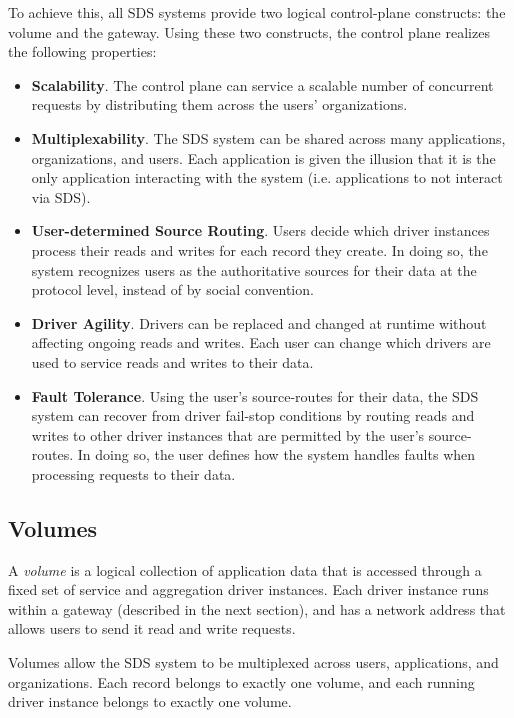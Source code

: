 To achieve this, all SDS systems provide two logical control-plane
constructs: the volume and the gateway.  Using these two constructs, the control
plane realizes the following properties:

\begin{itemize}
    \item \textbf{Scalability}.  The control plane can service a scalable number
       of concurrent requests by distributing them across the users'
       organizations.
    \item \textbf{Multiplexability}.  The SDS system can be shared across many
       applications, organizations, and users.  Each application is given the
       illusion that it is the only application interacting with the system
       (i.e. applications to not interact via SDS).
    \item \textbf{User-determined Source Routing}.  Users decide which driver
       instances process their reads and writes for each record they create.
       In doing so, the system recognizes users as the authoritative sources for
       their data at the protocol level, instead of by social convention.
    \item \textbf{Driver Agility}.  Drivers can be replaced and changed at
       runtime without affecting ongoing reads and writes.  Each user can change
       which drivers are used to service reads and writes to their data.
    \item \textbf{Fault Tolerance}.  Using the user's source-routes for their
       data, the SDS system can recover from driver fail-stop conditions by
       routing reads and writes to other driver instances that are permitted by
       the user's source-routes.  In doing so, the user defines how the system
       handles faults when processing requests to their data.
\end{itemize}

\subsection{Volumes}

A \emph{volume} is a logical collection of
application data that is accessed through a fixed set of service and aggregation
driver instances.  Each driver instance runs within a gateway
(described in the next section), and has a
network address that allows users to send it read and write
requests.  

Volumes allow the SDS system to be multiplexed across users, applications, and
organizations.  Each record belongs to exactly one volume, and each running
driver instance belongs to exactly one volume.

